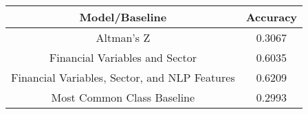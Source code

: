 \footnotesize
\begin{tabular}{cc}
\toprule
Model/Baseline & Accuracy \\
\midrule
Altman's Z & 0.3067 \\
Financial Variables and Sector & 0.6035 \\
Financial Variables, Sector, and NLP Features & 0.6209 \\
Most Common Class Baseline & 0.2993 \\
\bottomrule
\end{tabular}

\normalsize